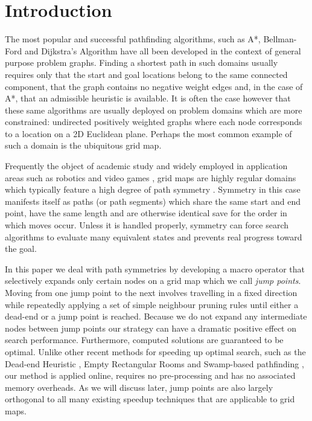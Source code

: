 \section{Introduction}
The most popular and successful pathfinding algorithms, such as A*, Bellman-Ford
and Dijkstra's Algorithm have all been developed in the context of general
purpose problem graphs.  Finding a shortest path in such domains usually
requires only that the start and goal locations belong to the same connected
component, that the graph contains no negative weight edges and, in the case of
A*, that an admissible heuristic is available.  It is often the case however
that these same algorithms are usually deployed on problem domains which are
more constrained: undirected positively weighted graphs where each node
corresponds to a location on a 2D Euclidean plane.
Perhaps the most common example of such a domain is the ubiquitous grid map.

Frequently the object of academic study \cite{yap02,botea04,bjornsson06} and
widely employed in application areas such as robotics \cite{choset05} and video
games \cite{sturtevant07}, grid maps are highly regular domains which
typically feature a high degree of path symmetry \cite{harabor10,pochter10}.
Symmetry in this case manifests itself as paths (or path segments) which share
the same start and end point, have the same length and are otherwise identical
save for the order in which moves occur.
Unless it is handled properly, symmetry can force search algorithms 
to evaluate many equivalent states and prevents real progress toward
the goal.

In this paper we deal with path symmetries by developing a macro 
operator that selectively expands only certain nodes on a grid map which we call
\emph{jump points}. Moving from one jump point to the next involves travelling
in a fixed direction while repeatedly applying a set of simple neighbour pruning
rules until either a dead-end or a jump point is reached.  Because we do not
expand any intermediate nodes between jump points our strategy can have a
dramatic positive effect on search performance.  Furthermore, computed solutions
are guaranteed to be optimal.  Unlike other recent methods for speeding up
optimal search, such as the Dead-end Heuristic \cite{bjornsson06}, Empty
Rectangular Rooms \cite{harabor10} and Swamp-based pathfinding \cite{pochter10},
our method is applied online, requires no pre-processing and has no associated
memory overheads.  As we will discuss later, jump points are also largely
orthogonal to all many existing speedup techniques that are applicable to grid
maps.

